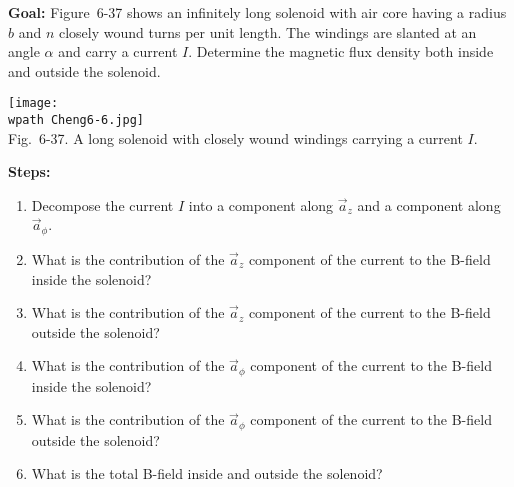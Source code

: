\documentclass[../../header.tex]{subfiles}
\begin{document}
\begin{minipage}{0.6\columnwidth}
\textbf{Goal:} Figure~6-37 shows an infinitely long solenoid with air core having a radius $b$ and $n$ closely wound turns per unit length. The windings are slanted at an angle $\alpha$ and carry a current $I$. Determine the magnetic flux density both inside and outside the solenoid.
\end{minipage}
\begin{minipage}{0.4\columnwidth}
\begin{center}
\texttt{[image: \\wpath Cheng6-6.jpg]}\\
Fig.~6-37. A long solenoid with closely wound windings carrying a current $I$.
\end{center}
\end{minipage}
\textbf{Steps:} 
\begin{enumerate}
\item Decompose the current $I$ into a component along $\vec{a}_z$ and a component along $\vec{a}_{\phi}$.\\

\item What is the contribution of the $\vec{a}_z$ component of the current to the B-field inside the solenoid?\\

\item What is the contribution of the $\vec{a}_z$ component of the current to the B-field outside the solenoid?\\

\item What is the contribution of the $\vec{a}_{\phi}$ component of the current to the B-field inside the solenoid?\\

\item What is the contribution of the $\vec{a}_{\phi}$ component of the current to the B-field outside the solenoid?\\

\item What is the total B-field inside and outside the solenoid?\\

\end{enumerate}
\end{document}
